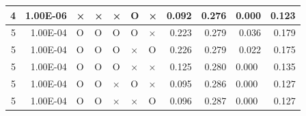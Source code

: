 \documentclass[11pt]{article}
\begin{document}
\begin{longtable}[h]{|r|r|l|l|l|l|l|r|r|l|r|}
4                                 & 1.00E-06                         & ×                                & ×                                & ×                                & O                                & ×                                 & 0.092                             & 0.276                             & 0.000                              & 0.123                               \\ \hline
5                                 & 1.00E-04                         & O                                & O                                & O                                & O                                & ×                                 & 0.223                             & 0.279                             & \multicolumn{1}{r|}{0.036}         & 0.179                               \\ \hline
5                                 & 1.00E-04                         & O                                & O                                & O                                & ×                                & O                                 & 0.226                             & 0.279                             & \multicolumn{1}{r|}{0.022}         & 0.175                               \\ \hline
5                                 & 1.00E-04                         & O                                & O                                & O                                & ×                                & ×                                 & 0.125                             & 0.280                             & 0.000                              & 0.135                               \\ \hline
5                                 & 1.00E-04                         & O                                & O                                & ×                                & O                                & ×                                 & 0.095                             & 0.286                             & 0.000                              & 0.127                               \\ \hline
5                                 & 1.00E-04                         & O                                & O                                & ×                                & ×                                & O                                 & 0.096                             & 0.287                             & 0.000                              & 0.127                               \\ \hline

\end{longtable}
\end{document}
